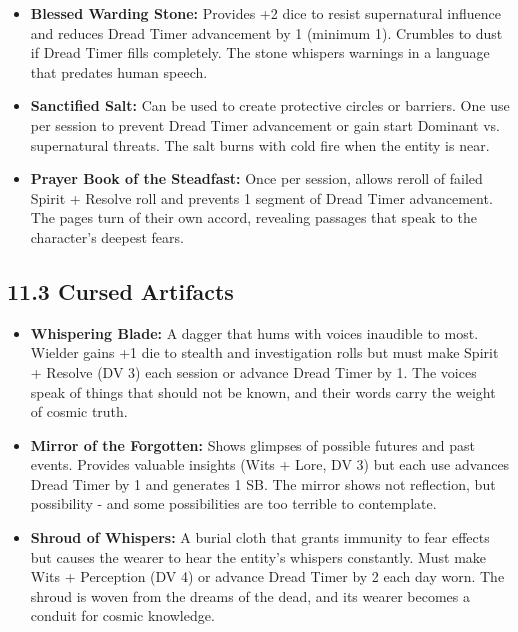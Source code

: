 \documentclass[11pt]{article}
\begin{document}
\begin{itemize}
\item \textbf{Blessed Warding Stone:} Provides +2 dice to resist supernatural influence and reduces Dread Timer advancement by 1 (minimum 1). Crumbles to dust if Dread Timer fills completely. The stone whispers warnings in a language that predates human speech.
\item \textbf{Sanctified Salt:} Can be used to create protective circles or barriers. One use per session to prevent Dread Timer advancement or gain start Dominant vs. supernatural threats. The salt burns with cold fire when the entity is near.
\item \textbf{Prayer Book of the Steadfast:} Once per session, allows reroll of failed Spirit + Resolve roll and prevents 1 segment of Dread Timer advancement. The pages turn of their own accord, revealing passages that speak to the character's deepest fears.
\end{itemize}

\clearpage

\subsection*{11.3 Cursed Artifacts}

\begin{itemize}
\item \textbf{Whispering Blade:} A dagger that hums with voices inaudible to most. Wielder gains +1 die to stealth and investigation rolls but must make Spirit + Resolve (DV 3) each session or advance Dread Timer by 1. The voices speak of things that should not be known, and their words carry the weight of cosmic truth.
\item \textbf{Mirror of the Forgotten:} Shows glimpses of possible futures and past events. Provides valuable insights (Wits + Lore, DV 3) but each use advances Dread Timer by 1 and generates 1 SB. The mirror shows not reflection, but possibility - and some possibilities are too terrible to contemplate.
\item \textbf{Shroud of Whispers:} A burial cloth that grants immunity to fear effects but causes the wearer to hear the entity's whispers constantly. Must make Wits + Perception (DV 4) or advance Dread Timer by 2 each day worn. The shroud is woven from the dreams of the dead, and its wearer becomes a conduit for cosmic knowledge.
\end{itemize}

\clearpage
\end{document}
